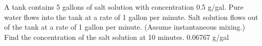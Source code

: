 {
A tank contains 5 gallons of salt solution with concentration 0.5 g/gal.  Pure water flows into the tank at a rate of 1 gallon per minute.  Salt solution flows out of the tank at a rate of 1 gallon per minute.  (Assume instantaneous mixing.) Find the concentration of the salt solution at 10 minutes.  
}
{
0.06767 g/gal
}
